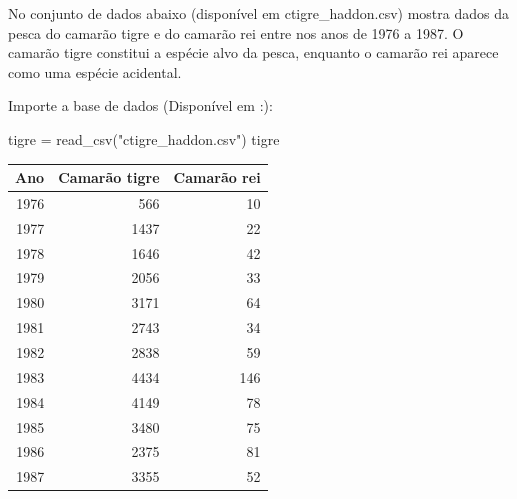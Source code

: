 \documentclass[
]{book}
\newenvironment{Shaded}{\begin{snugshade}}{\end{snugshade}}
\newcommand{\FunctionTok}[1]{\textcolor[rgb]{0.00,0.00,0.00}{#1}}
\newcommand{\NormalTok}[1]{#1}
\newcommand{\OtherTok}[1]{\textcolor[rgb]{0.56,0.35,0.01}{#1}}
\newcommand{\StringTok}[1]{\textcolor[rgb]{0.31,0.60,0.02}{#1}}
\begin{document}
No conjunto de dados abaixo \citep{haddon2010modelling} (disponível em ctigre\_haddon.csv) mostra dados da pesca do camarão tigre e do camarão rei entre nos anos de 1976 a 1987. O camarão tigre constitui a espécie alvo da pesca, enquanto o camarão rei aparece como uma espécie acidental.

Importe a base de dados (Disponível em :):

\begin{Shaded}
\begin{Highlighting}[]
\NormalTok{tigre }\OtherTok{=} \FunctionTok{read\_csv}\NormalTok{(}\StringTok{"ctigre\_haddon.csv"}\NormalTok{)}
\NormalTok{tigre}
\end{Highlighting}
\end{Shaded}

\begin{tabular}{r|r|r}
\hline
Ano & Camarão tigre & Camarão rei\\
\hline
1976 & 566 & 10\\
\hline
1977 & 1437 & 22\\
\hline
1978 & 1646 & 42\\
\hline
1979 & 2056 & 33\\
\hline
1980 & 3171 & 64\\
\hline
1981 & 2743 & 34\\
\hline
1982 & 2838 & 59\\
\hline
1983 & 4434 & 146\\
\hline
1984 & 4149 & 78\\
\hline
1985 & 3480 & 75\\
\hline
1986 & 2375 & 81\\
\hline
1987 & 3355 & 52\\
\hline
\end{tabular}
\end{document}
